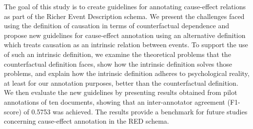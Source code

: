 The goal of this study is to create guidelines for annotating cause-effect relations as part of the Richer Event Description schema. We present the challenges faced using the definition of causation in terms of counterfactual dependence and propose new guidelines for cause-effect annotation using an alternative definition which treats causation as an intrinsic relation between events. To support the use of such an intrinsic definition, we examine the theoretical problems that the counterfactual definition faces, show how the intrinsic definition solves those problems, and explain how the intrinsic definition adheres to psychological reality, at least for our annotation purposes, better than the counterfactual definition. We then evaluate the new guidelines by presenting results obtained from pilot annotations of ten documents, showing that an inter-annotator agreement (F1-score) of 0.5753 was achieved. The results provide a benchmark for future studies concerning cause-effect annotation in the RED schema.
